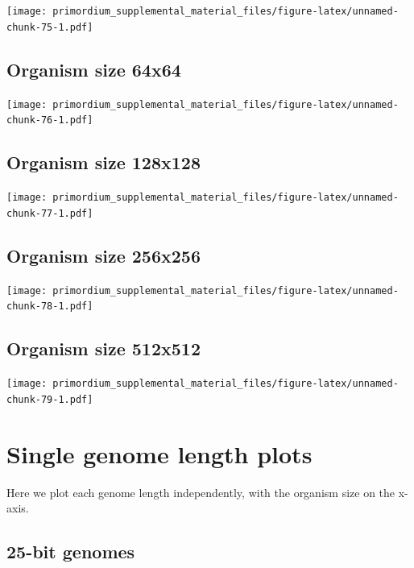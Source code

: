 \documentclass[]{book}
\begin{document}
\texttt{[image: primordium\_supplemental\_material\_files/figure-latex/unnamed-chunk-75-1.pdf]}

\hypertarget{organism-size-64x64-2}{%
\subsection{Organism size 64x64}\label{organism-size-64x64-2}}

\texttt{[image: primordium\_supplemental\_material\_files/figure-latex/unnamed-chunk-76-1.pdf]}

\hypertarget{organism-size-128x128-2}{%
\subsection{Organism size 128x128}\label{organism-size-128x128-2}}

\texttt{[image: primordium\_supplemental\_material\_files/figure-latex/unnamed-chunk-77-1.pdf]}

\hypertarget{organism-size-256x256-2}{%
\subsection{Organism size 256x256}\label{organism-size-256x256-2}}

\texttt{[image: primordium\_supplemental\_material\_files/figure-latex/unnamed-chunk-78-1.pdf]}

\hypertarget{organism-size-512x512-2}{%
\subsection{Organism size 512x512}\label{organism-size-512x512-2}}

\texttt{[image: primordium\_supplemental\_material\_files/figure-latex/unnamed-chunk-79-1.pdf]}

\hypertarget{single-genome-length-plots}{%
\section{Single genome length plots}\label{single-genome-length-plots}}

Here we plot each genome length independently, with the organism size on the x-axis.

\hypertarget{bit-genomes}{%
\subsection{25-bit genomes}\label{bit-genomes}}
\end{document}
